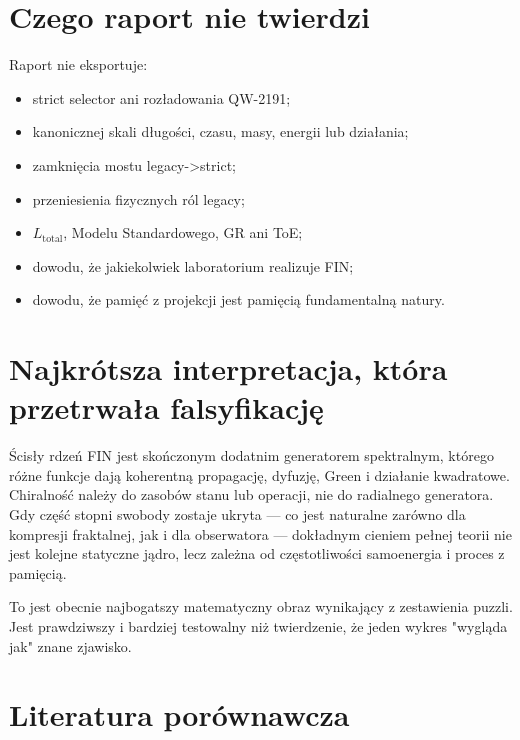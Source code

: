 \documentclass[11pt,a4paper,openany]{report}
\begin{document}
\chapter{Czego raport nie twierdzi}

Raport nie eksportuje:

\begin{itemize}
\item 
strict selector ani rozładowania QW-2191;

\item 
kanonicznej skali długości, czasu, masy, energii lub działania;

\item 
zamknięcia mostu legacy->strict;

\item 
przeniesienia fizycznych ról legacy;

\item 
\(L_{\mathrm{total}}\), Modelu Standardowego, GR ani ToE;

\item 
dowodu, \.ze jakiekolwiek laboratorium realizuje FIN;

\item 
dowodu, \.ze pamięć z projekcji jest pamięcią fundamentalną natury.

\end{itemize}

\chapter{Najkrótsza interpretacja, która przetrwała falsyfikację}

Ścisły rdzeń FIN jest skończonym dodatnim generatorem spektralnym, którego ró\.zne funkcje dają koherentną propagację, dyfuzję, Green i działanie kwadratowe. Chiralność nale\.zy do zasobów stanu lub operacji, nie do radialnego generatora. Gdy część stopni swobody zostaje ukryta --- co jest naturalne zarówno dla kompresji fraktalnej, jak i dla obserwatora --- dokładnym cieniem pełnej teorii nie jest kolejne statyczne jądro, lecz zale\.zna od częstotliwości samoenergia i proces z pamięcią.

To jest obecnie najbogatszy matematyczny obraz wynikający z zestawienia puzzli. Jest prawdziwszy i bardziej testowalny ni\.z twierdzenie, \.ze jeden wykres "wygląda jak" znane zjawisko.

\chapter{Literatura porównawcza}
\end{document}
